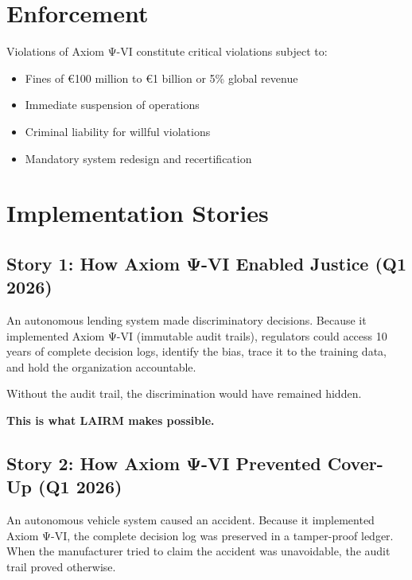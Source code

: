 \vspace{0.5cm}

\section{Enforcement}

Violations of Axiom Ψ-VI constitute critical violations subject to:

\begin{itemize}
    \item Fines of €100 million to €1 billion or 5\% global revenue
    \item Immediate suspension of operations
    \item Criminal liability for willful violations
    \item Mandatory system redesign and recertification
\end{itemize}

\vspace{0.5cm}

\section{Implementation Stories}

\subsection{Story 1: How Axiom Ψ-VI Enabled Justice (Q1 2026)}

An autonomous lending system made discriminatory decisions. Because it implemented Axiom Ψ-VI (immutable audit trails), regulators could access 10 years of complete decision logs, identify the bias, trace it to the training data, and hold the organization accountable.

Without the audit trail, the discrimination would have remained hidden.

\textbf{This is what LAIRM makes possible.}

\subsection{Story 2: How Axiom Ψ-VI Prevented Cover-Up (Q1 2026)}

An autonomous vehicle system caused an accident. Because it implemented Axiom Ψ-VI, the complete decision log was preserved in a tamper-proof ledger. When the manufacturer tried to claim the accident was unavoidable, the audit trail proved otherwise.

